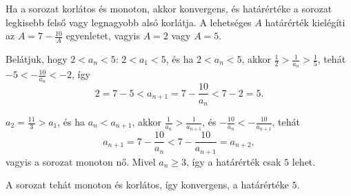 \documentclass[11pt]{scrartcl}
\begin{document}
Ha a sorozat korlátos és monoton, akkor konvergens, és határértéke a sorozat
legkisebb felső vagy legnagyobb alsó korlátja. A lehetséges $A$ határérték
kielégíti az $A = 7 - \frac{10}{A}$ egyenletet, vagyis $A = 2$ vagy $A = 5$.

Belátjuk, hogy $2 < a_n < 5$: $2 < a_1 < 5$, és ha $2 < a_n < 5$, akkor
$\frac{1}{2} > \frac{1}{a_n} > \frac{1}{5}$, tehát
$-5 < -\frac{10}{a_n} < -2$, így
\[
	2 = 7 - 5 < a_{n + 1} = 7 - \frac{10}{a_n} < 7 - 2 = 5.
\]

$a_2 = \frac{11}{3} > a_1$, és ha $a_n < a_{n + 1}$, akkor
$\frac{1}{a_n} > \frac{1}{a_{n + 1}}$, és
$-\frac{10}{a_n} < -\frac{10}{a_{n + 1}}$, tehát
\[
	a_{n + 1} = 7 - \frac{10}{a_n} < 7 - \frac{10}{a_{n + 1}} = a_{n + 2},
\]
vagyis a sorozat monoton nő. Mivel $a_n \ge 3$, így a határérték csak $5$
lehet.

A sorozat tehát monoton és korlátos, így konvergens, a határértéke $5$.
\end{document}
